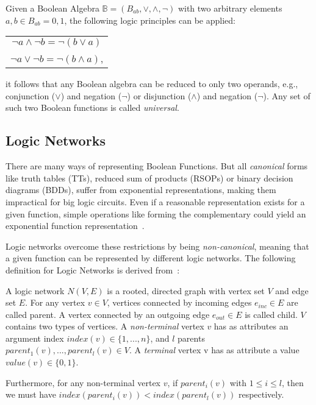 \begin{definition}
	Given a Boolean Algebra $\mathbb{B} = (B_{ab}, \vee, \wedge, \neg)$ with two arbitrary elements $a,b \in B_{ab} = {0, 1}$, the following logic principles can be applied:
	\begin{table}[h]
		\centering
		\begin{tabular}{c}
			$\neg a \wedge \neg b = \neg (b \vee a)$ \\
			$\neg a \vee \neg b = \neg (b \wedge a)$,
		\end{tabular}
	\end{table}
\end{definition}

it follows that any Boolean algebra can be reduced to only two operands, e.g., conjunction ($\vee$) and negation ($\neg$) or disjunction ($\wedge$) and negation ($\neg$). Any set of such two Boolean functions is called \textit{universal}.

\subsection{Logic Networks}

There are many ways of representing Boolean Functions. But all \textit{canonical} forms like truth tables (TTs), reduced sum of products (RSOPs) or binary decision diagrams (BDDs), suffer from exponential representations, making them impractical for big logic circuits. Even if a reasonable representation exists for a given function, simple operations like forming the complementary could yield an exponential function representation~\cite{canonical}.

Logic networks overcome these restrictions by being \textit{non-canonical}, meaning that a given function can be represented by different logic networks. The following definition for Logic Networks is derived from~\cite{LogicNetwork}:

\begin{definition}
	A logic network $N(V, E)$ is a rooted, directed graph with vertex set $V$ and edge set $E$. For any vertex $v \in V$, vertices connected by incoming edges $e_{inc} \in E$ are called parent. A vertex connected by an outgoing edge $e_{out} \in E$ is called child.
	$V$ contains two types of vertices. A \textit{non-terminal} vertex $v$ has as attributes an argument index $index(v) \in \{1, . . .,n\}$, and $l$ parents $parent_1(v), ..., parent_l(v) \in V$. 
	A \textit{terminal} vertex v has as attribute a value $value(v)\in\{0,1\}$.
	
	Furthermore, for any non-terminal vertex $v$, if $parent_i(v)$ with $ 1 \leq i \leq l$, then we must have $index(parent_i(v)) < index(parent_l(v))$ respectively.
\end{definition}

